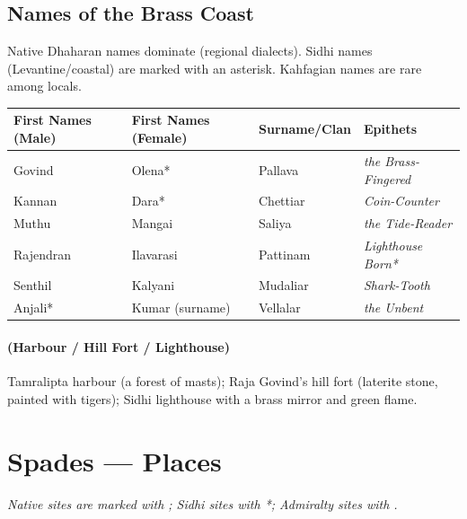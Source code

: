 \subsection*{Names of the Brass Coast}
\label{sec:brasscoast-names}

Native Dhaharan names dominate (regional dialects). Sidhi names (Levantine/coastal) are marked with an asterisk. Kahfagian names are rare among locals.

\begin{longtable}{|p{}|p{}|p{}|p{}|}
\hline
\textbf{First Names (Male)} & \textbf{First Names (Female)} & \textbf{Surname/Clan} & \textbf{Epithets} \\
\hline
Govind & Olena* & Pallava & \textit{the Brass-Fingered} \\
\hline
Kannan & Dara* & Chettiar & \textit{Coin-Counter} \\
\hline
Muthu & Mangai & Saliya & \textit{the Tide-Reader} \\
\hline
Rajendran & Ilavarasi & Pattinam & \textit{Lighthouse Born*} \\
\hline
Senthil & Kalyani & Mudaliar & \textit{Shark-Tooth} \\
\hline
Anjali* & Kumar (surname) & Vellalar & \textit{the Unbent} \\
\hline
\end{longtable}

\paragraph*{(Harbour / Hill Fort / Lighthouse)} Tamralipta harbour (a forest of masts); Raja Govind's hill fort (laterite stone, painted with tigers); Sidhi lighthouse with a brass mirror and green flame.

\section*{Spades --- Places}
\label{sec:brasscoast-places}

\noindent
\textit{Native sites are marked with \textdagger; Sidhi sites with *; Admiralty sites with \textdaggerdbl.}

